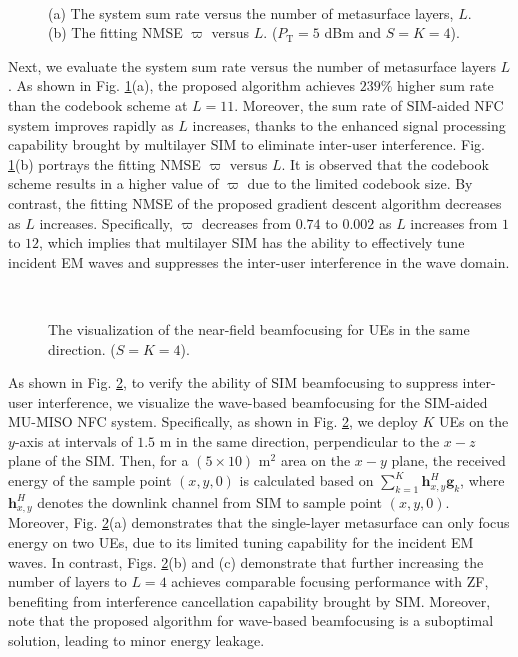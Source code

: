 \documentclass[conference]{IEEEtran}
\theoremstyle{remark}
\begin{document}
\begin{figure}[!t]
\centering
{}\\
\caption{ (a) The system sum rate versus the number of metasurface layers, $L$. (b) The fitting NMSE ${\varpi }$ versus $L$. ($P_\text{T}= 5$ dBm and $S=K=4$).}
\label{fig_8}
\end{figure}
Next, we evaluate the system sum rate versus the number of metasurface layers $L$. 
As shown in Fig. \ref{fig_8}(a), the proposed algorithm achieves $239\%$ higher sum rate than the codebook scheme at $L=11$.
Moreover, the sum rate of SIM-aided NFC system improves rapidly as $L$ increases, thanks to the enhanced signal processing capability brought by multilayer SIM to eliminate inter-user interference.
Fig. \ref{fig_8}(b) portrays the fitting NMSE ${\varpi }$ versus $L$. It is observed that the codebook scheme results in a higher value of $\varpi $ due to the limited codebook size. By contrast, the fitting NMSE of the proposed gradient descent algorithm decreases as $L$ increases. Specifically, ${\varpi}$ decreases from $0.74$ to $0.002$ as $L$ increases from $1$ to $12$, which implies that multilayer SIM has the ability to effectively tune incident EM waves and suppresses the inter-user interference in the wave domain. 

\begin{figure}[!t]
\centering
{} 
\\
\caption {The visualization of the near-field beamfocusing for UEs in the same direction. ($S=K=4$).}
\label{fig_10}
\end{figure}
As shown in Fig. \ref{fig_10}, to verify the ability of SIM beamfocusing to suppress inter-user interference, we visualize the wave-based beamfocusing for the SIM-aided MU-MISO NFC system.
Specifically, as shown in Fig. \ref{fig_10}, we deploy $K$ UEs on the $y$-axis at intervals of $1.5$ m in the same direction, perpendicular to the $x-z$ plane of the SIM.
Then, for a $(5\times10)$ m$^2$ area on the $x-y$ plane, the received energy of the sample point $(x,y,0)$ is calculated based on $ {\textstyle \sum_{k=1}^{K}} \mathbf{h}_{x,y}^{H} \mathbf{g}_{k}$, where $\mathbf{h}_{x,y}^{H}$ denotes the downlink channel from SIM to sample point $(x,y,0)$.
Moreover, Fig. \ref{fig_10}(a) demonstrates that the single-layer metasurface can only focus energy on two UEs, due to its limited tuning capability for the incident EM waves. In contrast, Figs. \ref{fig_10}(b) and (c) demonstrate that further increasing the number of layers to $L=4$ achieves comparable focusing performance with ZF, benefiting from interference cancellation capability brought by SIM.
Moreover, note that the proposed algorithm for wave-based beamfocusing is a suboptimal solution, leading to minor energy leakage.
\end{document}

